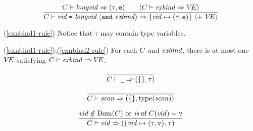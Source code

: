 \vspace*{4mm}
\begin{equation}	%
\label{exnbind2-rule}
\frac{\C\ts\longvid\ra(\tau,\estatus)\qquad 
      \langle\C\ts\exnbind\ra\VE\rangle }
      {\C\ts\longexnbindb\ra\{\vid\mapsto(\tau,\estatus)\}\ \langle +\ \VE\rangle}
\end{equation}
\comments
\begin{description}
\item{(\ref{exnbind1-rule})}
Notice that $\tau$ may contain type variables.
\item{(\ref{exnbind1-rule}),(\ref{exnbind2-rule})}
For each $C$ and ${\it exbind}$, there is at most one $\mbox{$V\!E$}$ satisfying 
$C\vdash{\it exbind}\Rightarrow\mbox{$V\!E$}$.
\end{description}


%
\begin{equation}	%
\frac{}
     {\C\ts\wildpat\ra (\emptymap,\tau)}\index{30.4}
\end{equation}

\begin{equation}	%
\frac{}
     {\C\ts\scon\ra (\emptymap,\scontype(\scon))}\index{30.5}
\end{equation}

\begin{equation}	%
\label{varpat-rule}
\frac{\vid\not\in\Dom(\C)\ {\rm or}\ \of{\is}{\C(\vid)}=\vstatus}
     {\C\ts\vid\ra (\{\vid\mapsto(\tau,\vstatus\},\tau) }
\end{equation}


